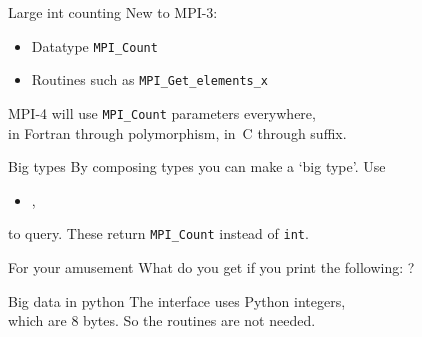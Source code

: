 \begin{numberedframe}{Large int counting}
  New to MPI-3: 
  \begin{itemize}
  \item Datatype \lstinline{MPI_Count}
  \item Routines such as \lstinline{MPI_Get_elements_x}
  \end{itemize}

  MPI-4 will use \lstinline{MPI_Count} parameters everywhere,\\
  in Fortran through polymorphism, in~C through  suffix.
\end{numberedframe}


\begin{numberedframe}{Big types}
  By composing types you can make a `big type'. Use
  \begin{itemize}
  \item {},
  \end{itemize}
  to query.
  These return \lstinline{MPI_Count} instead of \lstinline{int}.
\end{numberedframe}

\begin{numberedframe}{For your amusement}
What do you get if you print the following:
?
\end{numberedframe}

\begin{numberedframe}{Big data in python}
  The  interface uses Python integers,\\
  which are 8 bytes. So the  routines are not needed.
\end{numberedframe}

\endinput

\begin{numberedframe}{}
\begin{lstlisting}
\end{lstlisting}
\end{numberedframe}

